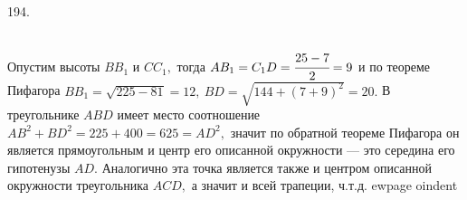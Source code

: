 194. \begin{figure}[ht!]
\end{figure}\\
Опустим высоты $BB_1$ и $CC_1,$ тогда $AB_1=C_1D=\cfrac{25-7}{2}=9$ и по теореме Пифагора $BB_1=\sqrt{225-81}=12,\ BD=\sqrt{144+(7+9)^2}=20.$ В треугольнике $ABD$ имеет место соотношение $AB^2+BD^2=225+400=625=AD^2,$ значит по обратной теореме Пифагора он является прямоугольным и центр его описанной окружности --- это середина его гипотенузы $AD.$ Аналогично эта точка является также и центром описанной окружности треугольника $ACD,$ а значит и всей трапеции, ч.т.д.
ewpage
oindent
